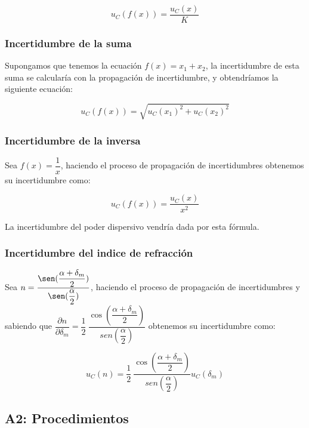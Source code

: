 \documentclass[10pt,onecolumn]{article}
\begin{document}
\begin{equation}
    \boxed{u_C(f(x)) = \dfrac{u_C(x)}{K}}
\end{equation}

\subsubsection{Incertidumbre de la suma}
Supongamos que tenemos la ecuación $f(x)=x_1+x_2$, la incertidumbre de esta suma se calcularía con la propagación de incertidumbre, y obtendríamos la siguiente ecuación:

\begin{equation}
    \boxed{u_C(f(x))=\sqrt{u_C(x_1)^2+u_C(x_2)^2}}
\end{equation}

\subsubsection{Incertidumbre de la inversa}
Sea $f(x) = \dfrac{1}{x}$, haciendo el proceso de propagación de incertidumbres obtenemos su incertidumbre como:

\begin{equation}
    \boxed{u_C(f(x)) = \dfrac{u_C(x)}{x^2}}
\end{equation}

La incertidumbre del poder dispersivo vendría dada por esta fórmula.
\subsubsection{Incertidumbre del indice de refracción}
Sea $n = \dfrac{\sen(\dfrac{\alpha + \delta_m}{2})}{\sen(\dfrac{\alpha}{2})}$, haciendo el proceso de propagación de incertidumbres 
y sabiendo que 
$\dfrac{\partial n}{\partial \delta_m} = \dfrac{1}{2}\ \dfrac{\cos(\dfrac{\alpha + \delta_m}{2})}{sen(\dfrac{\alpha}{2})}$ obtenemos su incertidumbre como:

\begin{equation}
    \boxed{u_C(n) = \dfrac{1}{2}\ \dfrac{\cos(\dfrac{\alpha + \delta_m}{2})}{sen(\dfrac{\alpha}{2})} u_C(\delta_m)}
\end{equation}


\subsection{A2: Procedimientos}


\end{document}
